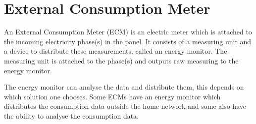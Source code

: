 \section{External Consumption Meter}\label{ecm}
An External Consumption Meter (ECM) is an electric meter which is attached to the incoming electricity phase(s) in the panel.
It consists of a measuring unit and a device to distribute these measurements, called an energy monitor.
The measuring unit is attached to the phase(s) and outputs raw measuring to the energy monitor.

The energy monitor can analyse the data and distribute them, this depends on which solution one chooses.
Some ECMs have an energy monitor which distributes the consumption data outside the home network and some also have the ability to analyse the consumption data.\cite{TED,efergy,open_energy_monitor}
